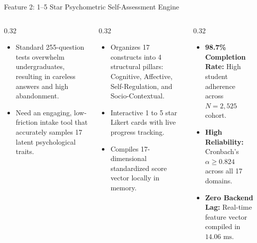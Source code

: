 \documentclass[aspectratio=169,10pt]{beamer}
\newcommand{\whybox}[2]{
  \begin{tcolorbox}[colframe=whyframe,colbacktitle=whyframe,colback=whybg,title=\textbf{WHY? The Problem \& Need (#1)}]
  \scriptsize #2
  \end{tcolorbox}
}
\newcommand{\howbox}[2]{
  \begin{tcolorbox}[colframe=howframe,colbacktitle=howframe,colback=howbg,title=\textbf{HOW? The Technology \& Algorithms (#1)}]
  \scriptsize #2
  \end{tcolorbox}
}
\newcommand{\outbox}[2]{
  \begin{tcolorbox}[colframe=outframe,colbacktitle=outframe,colback=outbg,title=\textbf{OUTCOMES? Measurable Impact \& Results (#1)}]
  \scriptsize #2
  \end{tcolorbox}
}
\begin{document}
\begin{frame}{Feature 2: 1--5 Star Psychometric Self-Assessment Engine}
\begin{columns}[T]
\begin{column}{0.32\textwidth}
\whybox{Overcoming Survey Fatigue}{
\begin{itemize}
    \item Standard 255-question tests overwhelm undergraduates, resulting in careless answers and high abandonment.
    \item Need an engaging, low-friction intake tool that accurately samples 17 latent psychological traits.
\end{itemize}
}
\end{column}

\begin{column}{0.32\textwidth}
\howbox{Clustered Assessment Engine}{
\begin{itemize}
    \item Organizes 17 constructs into 4 structural pillars: Cognitive, Affective, Self-Regulation, and Socio-Contextual.
    \item Interactive 1 to 5 star Likert cards with live progress tracking.
    \item Compiles 17-dimensional standardized score vector locally in memory.
\end{itemize}
}
\end{column}

\begin{column}{0.32\textwidth}
\outbox{Empirical Data Quality}{
\begin{itemize}
    \item \textbf{98.7\% Completion Rate:} High student adherence across $N=2,525$ cohort.
    \item \textbf{High Reliability:} Cronbach's $\alpha \ge 0.824$ across all 17 domains.
    \item \textbf{Zero Backend Lag:} Real-time feature vector compiled in $14.06\text{ ms}$.
\end{itemize}
}
\end{column}
\end{columns}
\end{frame}
\end{document}
